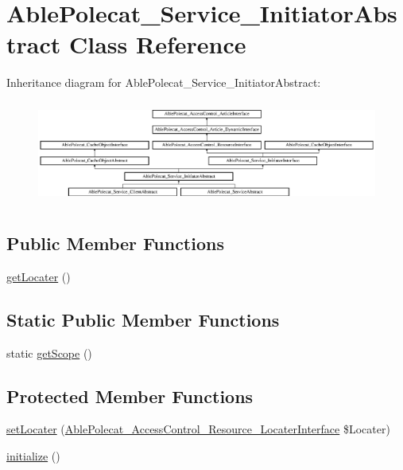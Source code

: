 \hypertarget{class_able_polecat___service___initiator_abstract}{}\section{Able\+Polecat\+\_\+\+Service\+\_\+\+Initiator\+Abstract Class Reference}
\label{class_able_polecat___service___initiator_abstract}
Inheritance diagram for Able\+Polecat\+\_\+\+Service\+\_\+\+Initiator\+Abstract\+:\begin{figure}[H]
\begin{center}
\leavevmode
\includegraphics[height=3.414634cm]{class_able_polecat___service___initiator_abstract}
\end{center}
\end{figure}
\subsection*{Public Member Functions}
\begin{DoxyCompactItemize}
\item 
\hyperlink{class_able_polecat___service___initiator_abstract_a66e49cc03d1511ec4c0290ffaa688079}{get\+Locater} ()
\end{DoxyCompactItemize}
\subsection*{Static Public Member Functions}
\begin{DoxyCompactItemize}
\item 
static \hyperlink{class_able_polecat___service___initiator_abstract_ad9ade868bd136d32967059d1cccb3e92}{get\+Scope} ()
\end{DoxyCompactItemize}
\subsection*{Protected Member Functions}
\begin{DoxyCompactItemize}
\item 
\hyperlink{class_able_polecat___service___initiator_abstract_a0865e167e6bb57e52c5df16037dad17d}{set\+Locater} (\hyperlink{interface_able_polecat___access_control___resource___locater_interface}{Able\+Polecat\+\_\+\+Access\+Control\+\_\+\+Resource\+\_\+\+Locater\+Interface} \$Locater)
\item 
\hyperlink{class_able_polecat___service___initiator_abstract_a91098fa7d1917ce4833f284bbef12627}{initialize} ()
\end{DoxyCompactItemize}


